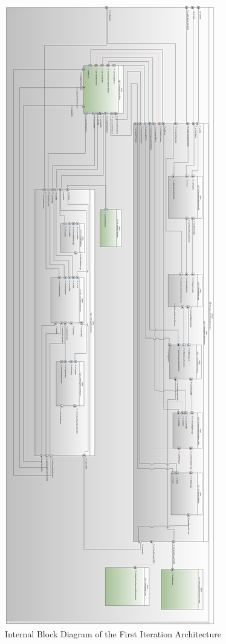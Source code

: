\documentclass{template/openetcs_article}
\begin{document}
\begin{figure}[p]
\centering
\includegraphics[scale=0.2]{../images/ManageLocationInformationIBD.PNG}
\caption{Internal Block Diagram of the First Iteration Architecture}
\end{figure}
\end{document}
